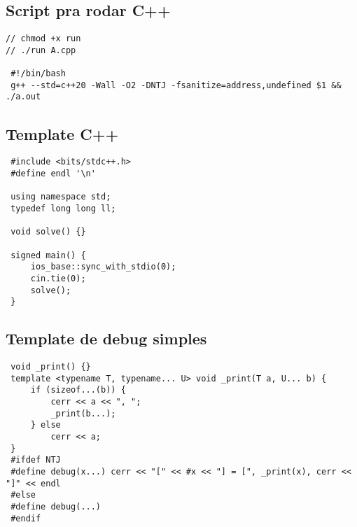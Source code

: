 \documentclass[11pt, a4paper, twoside]{article}
\begin{document}
\subsection{Script pra rodar C++}
\begin{lstlisting}
// chmod +x run
// ./run A.cpp

 #!/bin/bash
 g++ --std=c++20 -Wall -O2 -DNTJ -fsanitize=address,undefined $1 && ./a.out
\end{lstlisting}

\subsection{Template C++}
\begin{lstlisting}
 #include <bits/stdc++.h>
 #define endl '\n'
 
 using namespace std;
 typedef long long ll;
 
 void solve() {}
 
 signed main() {
     ios_base::sync_with_stdio(0);
     cin.tie(0);
     solve();
 }
\end{lstlisting}

\subsection{Template de debug simples}
\begin{lstlisting}
 void _print() {}
 template <typename T, typename... U> void _print(T a, U... b) {
     if (sizeof...(b)) {
         cerr << a << ", ";
         _print(b...);
     } else
         cerr << a;
 }
 #ifdef NTJ
 #define debug(x...) cerr << "[" << #x << "] = [", _print(x), cerr << "]" << endl
 #else
 #define debug(...)
 #endif
\end{lstlisting}
\end{document}
